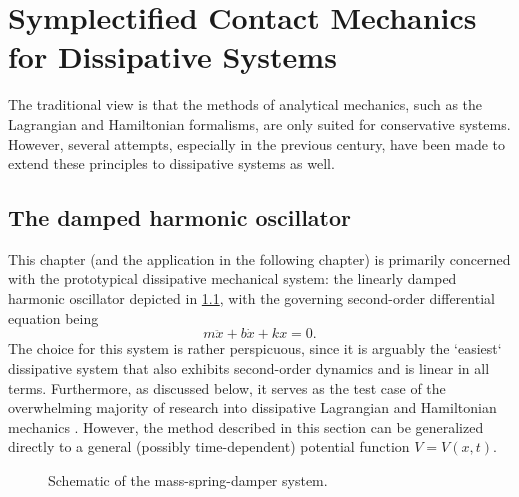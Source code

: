 \chapter{Symplectified Contact Mechanics for Dissipative Systems}

The traditional view is that the methods of analytical mechanics, such as the Lagrangian and Hamiltonian formalisms, are
only suited for conservative systems. However, several attempts, especially in the previous century, have been made to
extend these principles to dissipative systems as well. 

\section{The damped harmonic oscillator}
This chapter (and the application in the following chapter) is
primarily concerned with the prototypical dissipative mechanical system: the linearly damped harmonic oscillator
depicted in \cref{fig:dho}, with the governing second-order differential equation being
\begin{equation}  
  m\ddot{x} + b\dot{x} + kx= 0.
\end{equation}
The choice for this system is rather perspicuous, since it is arguably the `easiest` dissipative system that also
exhibits second-order dynamics and is linear in all terms. Furthermore, as discussed below, it serves as the test case
of the overwhelming majority of research into dissipative Lagrangian and Hamiltonian mechanics
\cite{Dekker1981,Hutters2020b}. However, the method described in this section can be generalized directly to a general
(possibly time-dependent) potential function $V = V(x, t)$.
\begin{figure}
    \begin{center}
        
    \end{center}
    \caption{Schematic of the mass-spring-damper system.}
    \label{fig:dho}
\end{figure}


